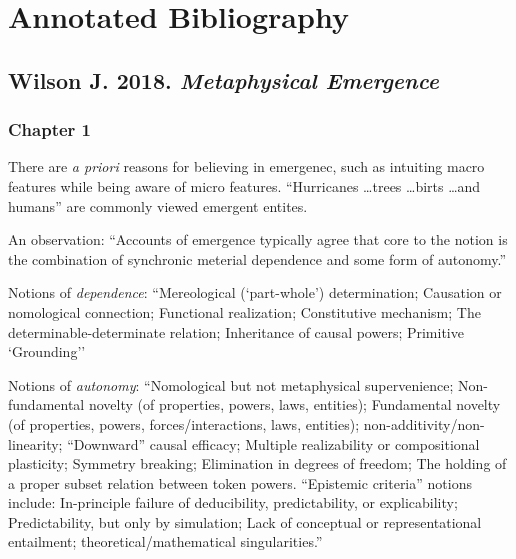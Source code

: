 \documentclass{article}
\newcommand{\ti}[1]{\textit{#1}}
\newcommand{\annbibtitle}[2]{\subsection*{#1. \ti{#2}}}
\begin{document}
\newpage
\section*{\centering Annotated Bibliography}
\bigskip \bigskip

\annbibtitle{Wilson J. 2018}{Metaphysical Emergence}
\subsubsection*{Chapter 1}

There are \ti{a priori} reasons for believing in emergenec, such as intuiting macro features while being aware of micro features. ``Hurricanes \dots trees \dots birts \dots and humans'' are commonly viewed emergent entites.

An observation: ``Accounts of emergence typically agree that core to the notion is the combination of synchronic meterial dependence and some form of autonomy.''

Notions of \ti{dependence}: ``Mereological (`part-whole') determination; Causation or nomological connection; Functional realization; Constitutive mechanism; The determinable-determinate relation; Inheritance of causal powers; Primitive `Grounding''

Notions of \ti{autonomy}: ``Nomological but not metaphysical supervenience; Non-fundamental novelty (of properties, powers, laws, entities); Fundamental novelty (of properties, powers, forces/interactions, laws, entities); non-additivity/non-linearity; ``Downward'' causal efficacy; Multiple realizability or compositional plasticity; Symmetry breaking; Elimination in degrees of freedom; The holding of a proper subset relation between token powers. “Epistemic criteria” notions include: In-principle failure of deducibility, predictability, or explicability; Predictability, but only by simulation; Lack of conceptual or representational entailment; theoretical/mathematical singularities.''
\end{document}
